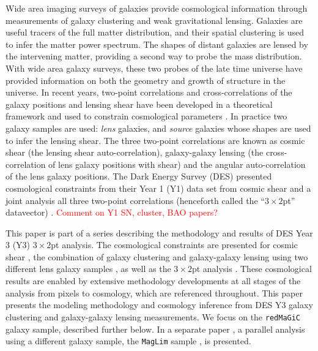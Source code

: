 \documentclass[fleqn,usenatbib]{mnras}
\newcommand{\redmagic}{\texttt{redMaGiC} }
\newcommand{\maglim}{\texttt{MagLim} }
\begin{document}
Wide area imaging surveys of galaxies provide cosmological information through measurements of galaxy clustering and weak gravitational lensing. Galaxies are useful tracers of the full matter distribution, and their spatial clustering is used to infer the matter power spectrum. The shapes of distant galaxies are lensed by the intervening matter, providing a second way to probe the mass distribution. With wide area galaxy surveys, these two probes of the late time universe have provided  information on both the geometry and growth of structure in the universe. 
In recent years, two-point correlations and cross-correlations of the galaxy positions and lensing shear have been developed in a theoretical framework \citep{Cacciato_2009,Baldauf_2010,Cacciato_2012,van_den_Bosch_2013} and used to constrain cosmological parameters  \citep{Cacciato_2013,Mandelbaum_2013,Kwan_2016,More_2015,Dvornik_2018,Coupon_2015}. In practice two galaxy samples are used:  {\it lens} galaxies, and {\it source} galaxies whose shapes are used to infer the lensing shear. The three two-point correlations are known as cosmic shear (the lensing shear auto-correlation), galaxy-galaxy lensing (the cross-correlation of lens galaxy positions with shear) and the angular auto-correlation of the lens galaxy positions.
The Dark Energy Survey (DES) presented cosmological constraints from their Year 1 (Y1) data set from cosmic shear \citep{Troxel_2018} and a joint analysis all three two-point correlations (henceforth called the ``$3\times2$pt'' datavector) \citep{Abbott_2018}. \textcolor{red}{Comment on Y1 SN, cluster, BAO papers?}

This paper is part of a series describing the methodology and results of DES Year 3 (Y3) $3\times2$pt analysis. The cosmological constraints are presented for cosmic shear \citep{y3-cosmicshear1,y3-cosmicshear2}, the combination of galaxy clustering and galaxy-galaxy lensing using two different lens galaxy samples \citep[this paper;][]{y3-2x2ptaltlensresults}, as well as the $3\times2$pt analysis \citep{y3-3x2ptkp}. These cosmological results are enabled by extensive methodology developments at all stages of the analysis from pixels to cosmology, which are referenced throughout. This paper presents the modeling methodology and cosmology inference from DES Y3 galaxy clustering \citep{y3-galaxyclustering} and galaxy-galaxy lensing \citep{y3-gglensing} measurements. 
We focus on the \redmagic \citep{Rozo_2016} galaxy sample, described further below. In a separate paper \citep{y3-2x2ptaltlensresults}, a parallel analysis using a different galaxy sample, the \maglim sample \citep{y3-2x2maglimforecast}, is presented. 
\end{document}
